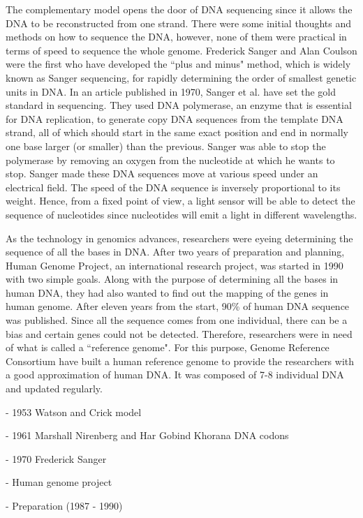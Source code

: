 The complementary model opens the door of DNA sequencing since it allows the DNA to be reconstructed from one strand. There were some initial thoughts and methods on how to sequence the DNA, however, none of them were practical in terms of speed to sequence the whole genome. Frederick Sanger and Alan Coulson were the first who have developed the ``plus and minus" method, which is widely known as Sanger sequencing, for rapidly determining the order of smallest genetic units in DNA\cite{sanger1975rapid}. In an article published in 1970, Sanger et al. have set the gold standard in sequencing. They used DNA polymerase, an enzyme that is essential for DNA replication, to generate copy DNA sequences from the template DNA strand, all of which should start in the same exact position and end in normally one base larger (or smaller) than the previous. Sanger was able to stop the polymerase by removing an oxygen from the nucleotide at which he wants to stop. Sanger made these DNA sequences move at various speed under an electrical field. The speed of the DNA sequence is inversely proportional to its weight. Hence, from a fixed point of view, a light sensor will be able to detect the sequence of nucleotides since nucleotides will emit a light in different wavelengths.

As the technology in genomics advances, researchers were eyeing determining the sequence of all the bases in DNA. After two years of preparation and planning, Human Genome Project, an international research project, was started in 1990 with two simple goals. Along with the purpose of determining all the bases in human DNA, they had also wanted to find out the mapping of the genes in human genome. After eleven years from the start, 90\% of human DNA sequence was published. Since all the sequence comes from one individual, there can be a bias and certain genes could not be detected. Therefore, researchers were in need of what is called a ``reference genome". For this purpose, Genome Reference Consortium have built a human reference genome to provide the researchers with a good approximation of human DNA. It was composed of 7-8 individual DNA and updated regularly. 



- 1953 Watson and Crick model

- 1961 Marshall Nirenberg and Har Gobind Khorana DNA codons

- 1970 Frederick Sanger

- Human genome project

    - Preparation (1987 - 1990)

